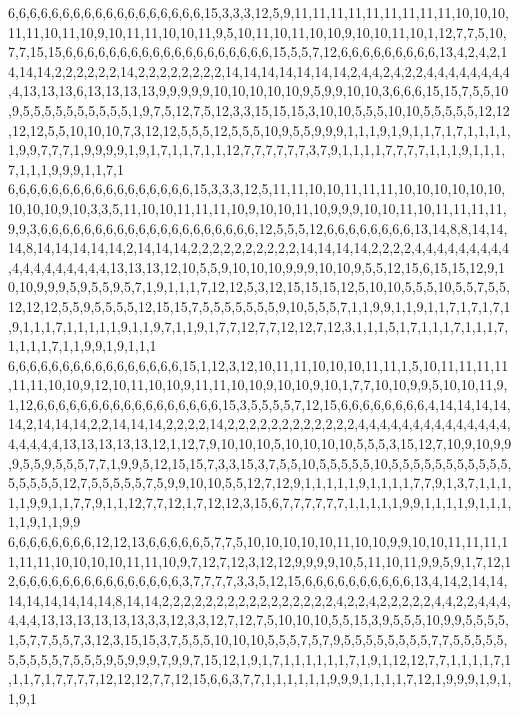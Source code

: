 6,6,6,6,6,6,6,6,6,6,6,6,6,6,6,6,6,6,15,3,3,3,12,5,9,11,11,11,11,11,11,11,11,11,10,10,10,11,11,10,11,10,9,10,11,11,10,10,11,9,5,10,11,10,11,10,10,9,10,10,11,10,1,12,7,7,5,10,7,7,15,15,6,6,6,6,6,6,6,6,6,6,6,6,6,6,6,6,6,6,6,15,5,5,7,12,6,6,6,6,6,6,6,6,6,13,4,2,4,2,14,14,14,2,2,2,2,2,2,14,2,2,2,2,2,2,2,2,14,14,14,14,14,14,14,2,4,4,2,4,2,2,4,4,4,4,4,4,4,4,4,13,13,13,6,13,13,13,13,9,9,9,9,9,10,10,10,10,10,9,5,9,9,10,10,3,6,6,6,15,15,7,5,5,10,9,5,5,5,5,5,5,5,5,5,5,1,9,7,5,12,7,5,12,3,3,15,15,15,3,10,10,5,5,5,10,10,5,5,5,5,5,12,12,12,12,5,5,10,10,10,7,3,12,12,5,5,5,12,5,5,5,10,9,5,5,9,9,9,1,1,1,9,1,9,1,1,7,1,7,1,1,1,1,1,9,9,7,7,7,1,9,9,9,9,1,9,1,7,1,1,7,1,1,12,7,7,7,7,7,7,3,7,9,1,1,1,1,7,7,7,7,1,1,1,9,1,1,1,7,1,1,1,9,9,9,1,1,7,1
6,6,6,6,6,6,6,6,6,6,6,6,6,6,6,6,6,15,3,3,3,12,5,11,11,10,10,11,11,11,10,10,10,10,10,10,10,10,10,9,10,3,3,5,11,10,10,11,11,11,10,9,10,10,11,10,9,9,9,10,10,11,10,11,11,11,11,9,9,3,6,6,6,6,6,6,6,6,6,6,6,6,6,6,6,6,6,6,6,6,12,5,5,5,12,6,6,6,6,6,6,6,6,13,14,8,8,14,14,14,8,14,14,14,14,14,2,14,14,14,2,2,2,2,2,2,2,2,2,2,14,14,14,14,2,2,2,2,4,4,4,4,4,4,4,4,4,4,4,4,4,4,4,4,4,4,13,13,13,12,10,5,5,9,10,10,10,9,9,9,10,10,9,5,5,12,15,6,15,15,12,9,10,10,9,9,9,5,9,5,5,9,5,7,1,9,1,1,1,7,12,12,5,3,12,15,15,15,12,5,10,10,5,5,5,10,5,5,7,5,5,12,12,12,5,5,9,5,5,5,5,12,15,15,7,5,5,5,5,5,5,5,9,10,5,5,5,7,1,1,9,9,1,1,9,1,1,7,1,7,1,7,1,9,1,1,1,7,1,1,1,1,1,9,1,1,9,7,1,1,9,1,7,7,12,7,7,12,12,7,12,3,1,1,1,5,1,7,1,1,1,7,1,1,1,7,1,1,1,1,7,1,1,9,9,1,9,1,1,1
6,6,6,6,6,6,6,6,6,6,6,6,6,6,6,6,15,1,12,3,12,10,11,11,10,10,10,11,11,1,5,10,11,11,11,11,11,11,10,10,9,12,10,11,10,10,9,11,11,10,10,9,10,10,9,10,1,7,7,10,10,9,9,5,10,10,11,9,1,12,6,6,6,6,6,6,6,6,6,6,6,6,6,6,6,6,6,15,3,5,5,5,5,7,12,15,6,6,6,6,6,6,6,6,4,14,14,14,14,14,2,14,14,14,2,2,14,14,14,2,2,2,2,14,2,2,2,2,2,2,2,2,2,2,2,2,4,4,4,4,4,4,4,4,4,4,4,4,4,4,4,4,4,4,4,13,13,13,13,13,12,1,12,7,9,10,10,10,5,10,10,10,10,5,5,5,3,15,12,7,10,9,10,9,9,9,5,5,9,5,5,5,7,7,1,9,9,5,12,15,15,7,3,3,15,3,7,5,5,10,5,5,5,5,5,10,5,5,5,5,5,5,5,5,5,5,5,5,5,5,5,5,12,7,5,5,5,5,5,7,5,9,9,10,10,5,5,12,7,12,9,1,1,1,1,1,9,1,1,1,1,7,7,9,1,3,7,1,1,1,1,1,9,9,1,1,7,7,9,1,1,12,7,7,12,1,7,12,12,3,15,6,7,7,7,7,7,7,1,1,1,1,1,9,9,1,1,1,1,9,1,1,1,1,1,9,1,1,9,9
6,6,6,6,6,6,6,6,12,12,13,6,6,6,6,6,5,7,7,5,10,10,10,10,10,11,10,10,9,9,10,10,11,11,11,11,11,11,10,10,10,10,11,11,10,9,7,12,7,12,3,12,12,9,9,9,9,10,5,11,10,11,9,9,5,9,1,7,12,12,6,6,6,6,6,6,6,6,6,6,6,6,6,6,6,3,7,7,7,7,3,3,5,12,15,6,6,6,6,6,6,6,6,6,6,13,4,14,2,14,14,14,14,14,14,14,14,8,14,14,2,2,2,2,2,2,2,2,2,2,2,2,2,2,2,2,4,2,2,4,2,2,2,2,2,4,4,2,2,4,4,4,4,4,4,13,13,13,13,13,13,3,3,12,3,3,12,7,12,7,5,10,10,10,5,5,15,3,9,5,5,5,10,9,9,5,5,5,5,1,5,7,7,5,5,7,3,12,3,15,15,3,7,5,5,5,10,10,10,5,5,5,7,5,7,9,5,5,5,5,5,5,5,5,7,7,5,5,5,5,5,5,5,5,5,5,7,5,5,5,9,5,9,9,9,7,9,9,7,15,12,1,9,1,7,1,1,1,1,1,1,7,1,9,1,12,12,7,7,1,1,1,1,7,1,1,1,7,1,7,7,7,7,12,12,12,7,7,12,15,6,6,3,7,7,1,1,1,1,1,1,9,9,9,1,1,1,1,7,12,1,9,9,9,1,9,1,1,9,1
